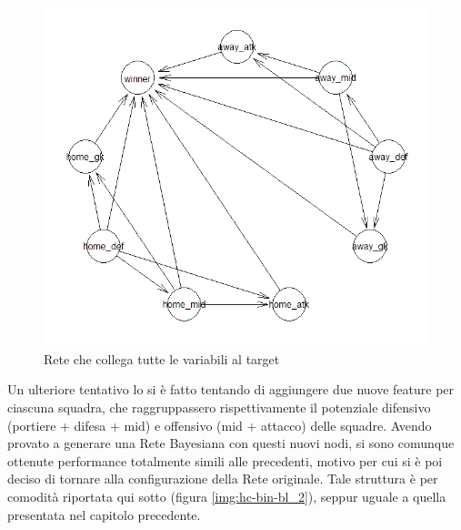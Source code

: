 \documentclass[hidelinks, 12pt]{article}
\begin{document}
\begin{figure}[H]
	\centering
	\includegraphics[scale=0.8]{images/06_02_hc_bin_wl_all.png}
	\caption[Rete che collega tutte le variabili al target]{Rete che collega tutte le variabili al target}
	\label{fig:hc-bin-all}
\end{figure}

\vspace{3ex}

Un ulteriore tentativo lo si è fatto tentando di aggiungere due nuove feature per ciascuna squadra, che raggruppassero rispettivamente il potenziale difensivo (portiere + difesa + mid) e offensivo (mid + attacco) delle squadre. Avendo provato a generare una Rete Bayesiana con questi nuovi nodi, si sono comunque ottenute performance totalmente simili alle precedenti, motivo per cui si è poi deciso di tornare alla configurazione della Rete originale. Tale struttura è per comodità riportata qui sotto (figura \ref{img:hc-bin-bl_2}), seppur uguale a quella presentata nel capitolo precedente.
\end{document}
